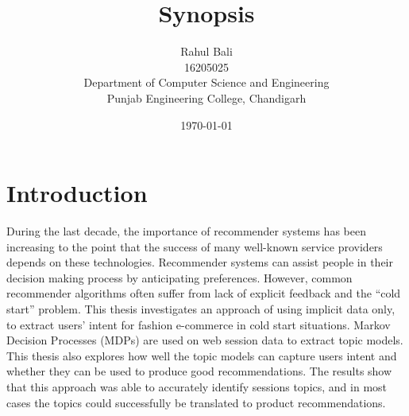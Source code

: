 \documentclass[12pt,a4paper]{article}
\title{\textbf{Synopsis}}
\author{Rahul Bali\\16205025\\Department of Computer Science and Engineering\\Punjab Engineering College, Chandigarh}
\date{\today}
\begin{document}
	\maketitle

	\section{Introduction}
	During the last decade, the importance of recommender systems has been increasing to the point that the success of many well-known service providers depends on these technologies. Recommender systems can assist people in their decision making process by anticipating preferences. However, common recommender algorithms often suffer from lack of explicit feedback and the “cold start” problem. This thesis investigates an approach of using implicit data only, to extract users’ intent for fashion e-commerce in cold start situations. Markov Decision Processes (MDPs) are used on web session data to extract topic models. This thesis also explores how well the topic models can capture users intent and whether they can be used to produce good recommendations. The results show that this approach was able to accurately identify sessions topics, and in most cases the topics could successfully be translated to product recommendations.\\
\end{document}
